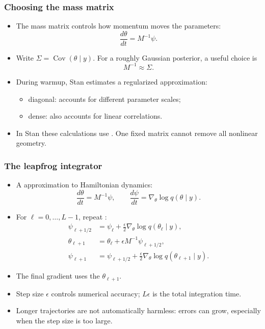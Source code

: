 \documentclass[10pt]{beamer}
\begin{document}
\begin{frame}
\frametitle{Choosing the mass matrix}

\begin{itemize}
\item The mass matrix controls how momentum moves the parameters:
\[
\frac{d\theta}{dt}=M^{-1}\psi.
\]
\item Write $\Sigma=\operatorname{Cov}(\theta\mid y)$.
  For a roughly Gaussian posterior, a useful choice is
\[
M^{-1}\approx\Sigma.
\]
\pause
\item During warmup, Stan estimates a regularized approximation:
\begin{itemize}
\item diagonal: accounts for different parameter scales;
\item dense: also accounts for linear correlations.
\end{itemize}
\item In Stan these calculations use .
  One fixed matrix cannot remove all nonlinear geometry.
\end{itemize}
\end{frame}


\begin{frame}

\frametitle{The leapfrog integrator}

\begin{itemize}
\item A  approximation to Hamiltonian dynamics:
\[
\frac{d\theta}{dt}=M^{-1}\psi,
\qquad
\frac{d\psi}{dt}=\nabla_\theta\log q(\theta\mid y).
\]
\pause
\item For $\ell=0,\ldots,L-1$, repeat :
\begin{align*}
\psi_{\ell+1/2} &= \psi_\ell
  +\frac{\epsilon}{2}\nabla_\theta\log q(\theta_\ell\mid y),\\
\theta_{\ell+1} &= \theta_\ell+\epsilon M^{-1}\psi_{\ell+1/2},\\
\psi_{\ell+1} &= \psi_{\ell+1/2}
  +\frac{\epsilon}{2}\nabla_\theta\log q(\theta_{\ell+1}\mid y).
\end{align*}
\item The final gradient uses the  $\theta_{\ell+1}$.
\pause
\item Step size $\epsilon$ controls numerical accuracy;
  $L\epsilon$ is the total integration time.
\item Longer trajectories are not automatically harmless: errors can
  grow, especially when the step size is too large.
\end{itemize}
\end{frame}
\end{document}
